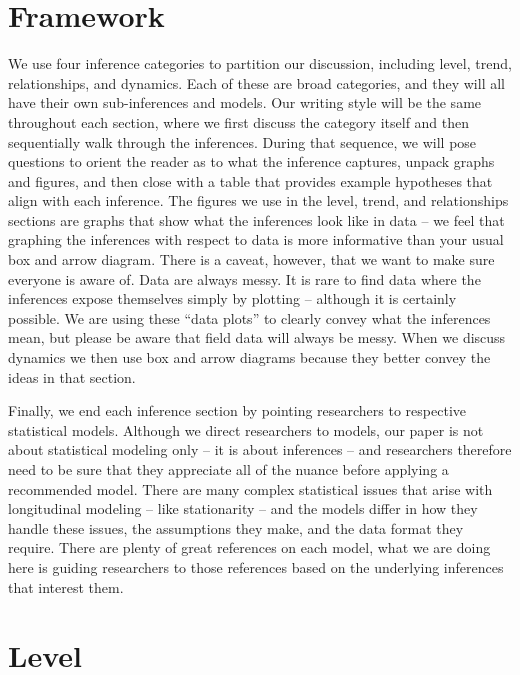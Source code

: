 \documentclass[english,,man]{apa6}
\theoremstyle{definition}
\theoremstyle{definition}
\theoremstyle{definition}
\theoremstyle{remark}
\begin{document}
\hypertarget{framework}{%
\section{Framework}\label{framework}}

We use four inference categories to partition our discussion, including
level, trend, relationships, and dynamics. Each of these are broad
categories, and they will all have their own sub-inferences and models.
Our writing style will be the same throughout each section, where we
first discuss the category itself and then sequentially walk through the
inferences. During that sequence, we will pose questions to orient the
reader as to what the inference captures, unpack graphs and figures, and
then close with a table that provides example hypotheses that align with
each inference. The figures we use in the level, trend, and
relationships sections are graphs that show what the inferences look
like in data -- we feel that graphing the inferences with respect to
data is more informative than your usual box and arrow diagram. There is
a caveat, however, that we want to make sure everyone is aware of. Data
are always messy. It is rare to find data where the inferences expose
themselves simply by plotting -- although it is certainly possible. We
are using these \enquote{data plots} to clearly convey what the
inferences mean, but please be aware that field data will always be
messy. When we discuss dynamics we then use box and arrow diagrams
because they better convey the ideas in that section.

Finally, we end each inference section by pointing researchers to
respective statistical models. Although we direct researchers to models,
our paper is not about statistical modeling only -- it is about
inferences -- and researchers therefore need to be sure that they
appreciate all of the nuance before applying a recommended model. There
are many complex statistical issues that arise with longitudinal
modeling -- like stationarity -- and the models differ in how they
handle these issues, the assumptions they make, and the data format they
require. There are plenty of great references on each model, what we are
doing here is guiding researchers to those references based on the
underlying inferences that interest them.

\hypertarget{level}{%
\section{Level}\label{level}}
\end{document}
